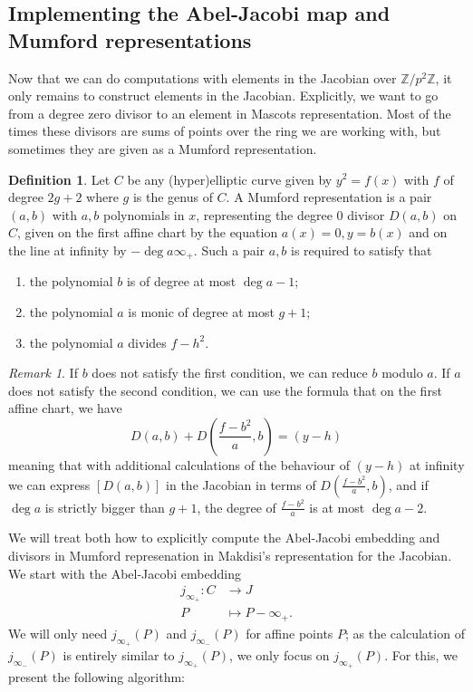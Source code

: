 \documentclass[12pt]{article}
\newcommand{\Z}{\mathbb{Z}}
\theoremstyle{plain}
\theoremstyle{definition}
\newtheorem{defn}[thm]{Definition} %
\theoremstyle{remark}
\newtheorem{rem}[thm]{Remark} %
\begin{document}
\subsection{Implementing the Abel-Jacobi map and Mumford representations}
Now that we can do computations with elements in the Jacobian over $\Z/p^2\Z$, it only remains to construct elements in the Jacobian. Explicitly, we want to go from a degree zero divisor to an element in Mascots representation. Most of the times these divisors are sums of points over the ring we are working with, but sometimes they are given as a Mumford representation.
\begin{defn}
Let $C$ be any (hyper)elliptic curve given by $y^2 = f(x)$ with $f$ of degree $2g+2$ where $g$ is the genus of $C$. A Mumford representation is a pair $(a,b)$ with $a,b$ polynomials in $x$, representing the degree $0$ divisor $D(a,b)$ on $C$, given on the first affine chart by the equation $a(x) = 0, y = b(x)$ and on the line at infinity by $-\deg a\infty_+$. Such a pair $a,b$ is required to satisfy that
\begin{enumerate}
\item the polynomial $b$ is of degree at most $\deg a -1$;
\item the polynomial $a$ is monic of degree at most $g+1$;
\item the polynomial $a$ divides $f - h^2$.
\end{enumerate}
\end{defn}
\begin{rem}
If $b$ does not satisfy the first condition, we can reduce $b$ modulo $a$. If $a$ does not satisfy the second condition, we can use the formula that on the first affine chart, we have
\[
D(a,b) + D\left(\frac{f-b^2}{a},b\right) = (y-h)
\]
meaning that with additional calculations of the behaviour of $(y-h)$ at infinity we can express $[D(a,b)]$ in the Jacobian in terms of $D(\frac{f-b^2}{a},b)$, and if $\deg a$ is strictly bigger than $g+1$, the degree of $\frac{f-b^2}{a}$ is at most $\deg a -2$.
\end{rem}

We will treat both how to explicitly compute the Abel-Jacobi embedding and divisors in Mumford represenation in Makdisi's representation for the Jacobian. We start with the Abel-Jacobi embedding 
\begin{align*}
j_{\infty_+}: C &\to J \\
              P &\mapsto P-\infty_+.
\end{align*}
We will only need $j_{\infty_+}(P)$ and $j_{\infty_-}(P)$ for affine points $P$; as the calculation of $j_{\infty_-}(P)$ is entirely similar to $j_{\infty_+}(P)$, we only focus on $j_{\infty_+}(P)$. For this, we present the following algorithm:
\end{document}
